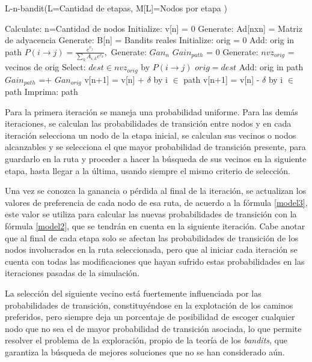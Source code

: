\begin{algorithm}
\caption{L-n-bandit(L=Cantidad de etapas, M[L]=Nodos por etapa )
} 
\label{Pseudo}
\begin{algorithmic}[1]
\STATE Calculate: n=Cantidad de nodos
\STATE Initialize: v[n] = 0
\STATE Generate: Ad[nxn] = Matriz de adyacencia
\STATE Generate: B[n] = Bandits reales
     \STATE Initialize: orig = 0
     \STATE Add: orig in path
     \STATE $P(i \to j) = \frac{e^{v_j}}{\sum_k A_{i,k} e^{v_k}},$
     \STATE Generate: $Gan_{n}$
     \STATE $Gain_{path}$ = 0
        \STATE Generate: $nvz_{orig}$ = vecinos de orig
        \STATE Select: $dest \in nvz_{orig}$  by $P(i \to j)$
        \STATE $orig = dest$
        \STATE Add: orig in path
        \STATE $Gain_{path}$ =+ $Gan_{orig}$
     \ENDFOR
        \STATE v[n+1] = v[n] + $\delta$ by i $\in$ path
     \ELSE
        \STATE v[n+1] = v[n] - $\delta$ by i $\in$ path   
     \ENDIF   
     \STATE Imprima: path
\ENDFOR
\end{algorithmic}
\end{algorithm}

Para la primera iteración se maneja una probabilidad uniforme. Para las demás iteraciones, se calculan las probabilidades de transición entre nodos y en cada iteración selecciona un nodo de la etapa inicial, se calculan sus vecinos o nodos alcanzables y se selecciona el que mayor probabilidad de transición presente, para guardarlo en la ruta y proceder a hacer la búsqueda de sus vecinos en la siguiente etapa, hasta llegar a la última, usando siempre el mismo criterio de selección.

Una vez se conozca la ganancia o pérdida al final de la iteración, se actualizan los valores de preferencia de cada nodo de esa ruta, de acuerdo a la fórmula \ref{model3}, este valor se utiliza para calcular las nuevas probabilidades de transición con la fórmula \ref{model2}, que se tendrán en cuenta en la siguiente iteración. Cabe anotar que al final de cada etapa solo se afectan las probabilidades de transición de los nodos involucrados en la ruta seleccionada, pero que al iniciar cada iteración se cuenta con todas las modificaciones que hayan sufrido estas probabilidades en las iteraciones pasadas de la simulación.

La selección del siguiente vecino está fuertemente influenciada por las probabilidades de transición, constituyéndose en la explotación de los caminos preferidos, pero siempre deja un porcentaje de posibilidad de escoger cualquier nodo que no sea el de mayor probabilidad de transición asociada, lo que permite resolver el problema de la exploración, propio de la teoría de los \textit{bandits}, que garantiza la búsqueda de mejores soluciones que no se han considerado aún.

